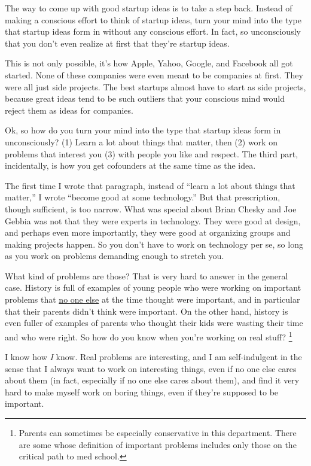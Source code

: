 \documentclass[12pt]{book}
\begin{document}
The way to come up with good startup ideas is to take a step back.
Instead of making a conscious effort to think of startup ideas, turn
your mind into the type that startup ideas form in without any conscious
effort. In fact, so unconsciously that you don't even realize at first
that they're startup ideas.

This is not only possible, it's how Apple, Yahoo, Google, and Facebook
all got started. None of these companies were even meant to be companies
at first. They were all just side projects. The best startups almost
have to start as side projects, because great ideas tend to be such
outliers that your conscious mind would reject them as ideas for
companies.

Ok, so how do you turn your mind into the type that startup ideas form
in unconsciously? (1) Learn a lot about things that matter, then (2)
work on problems that interest you (3) with people you like and respect.
The third part, incidentally, is how you get cofounders at the same time
as the idea.

The first time I wrote that paragraph, instead of ``learn a lot about
things that matter,'' I wrote ``become good at some technology.'' But
that prescription, though sufficient, is too narrow. What was special
about Brian Chesky and Joe Gebbia was not that they were experts in
technology. They were good at design, and perhaps even more importantly,
they were good at organizing groups and making projects happen. So you
don't have to work on technology per se, so long as you work on problems
demanding enough to stretch you.

What kind of problems are those? That is very hard to answer in the
general case. History is full of examples of young people who were
working on important problems that \href{marginal.html}{no one else} at
the time thought were important, and in particular that their parents
didn't think were important. On the other hand, history is even fuller
of examples of parents who thought their kids were wasting their time
and who were right. So how do you know when you're working on real
stuff? \footnote{Parents can sometimes be especially conservative in this
department. There are some whose definition of important problems
includes only those on the critical path to med school.}

I know how \emph{I} know. Real problems are interesting, and I am
self-indulgent in the sense that I always want to work on interesting
things, even if no one else cares about them (in fact, especially if no
one else cares about them), and find it very hard to make myself work on
boring things, even if they're supposed to be important.
\end{document}
